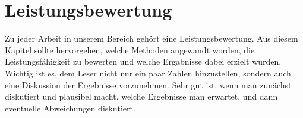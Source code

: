 \chapter{ Leistungsbewertung }
Zu jeder Arbeit in unserem Bereich gehört eine Leistungsbewertung. Aus diesem Kapitel sollte hervorgehen, welche Methoden angewandt worden, die Leistungsfähigkeit zu bewerten und welche Ergabnisse dabei erzielt wurden. Wichtig ist es, dem Leser nicht nur ein paar Zahlen hinzustellen, sondern auch eine Diskussion der Ergebnisse vorzunehmen. Sehr gut ist, wenn man zunächst diskutiert und plausibel macht, welche Ergebnisse man erwartet, und dann eventuelle Abweichungen diskutiert.
